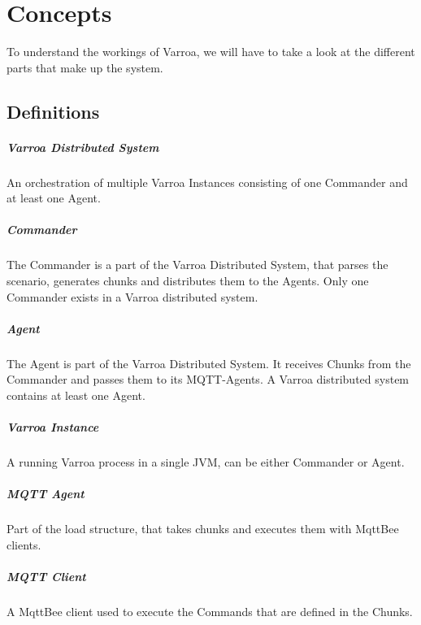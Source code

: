 \chapter{Concepts}
To understand the workings of Varroa, we will have to take a look at the different parts that make up the system.


\section{Definitions}

\paragraph{Varroa Distributed System}
An orchestration of multiple Varroa Instances consisting of one Commander and at least one Agent.

\paragraph{Commander}
The Commander is a part of the Varroa Distributed System, that parses the scenario, generates chunks and distributes them to the Agents.
Only one Commander exists in a Varroa distributed system.

\paragraph{Agent}
The Agent is part of the Varroa Distributed System.
It receives Chunks from the Commander and passes them to its MQTT-Agents.
A Varroa distributed system contains at least one Agent.

\paragraph{Varroa Instance}
A running Varroa process in a single JVM, can be either Commander or Agent.

\paragraph{MQTT Agent}
Part of the load structure, that takes chunks and executes them with MqttBee clients.

\paragraph{MQTT Client}
A MqttBee client used to execute the Commands that are defined in the Chunks.

